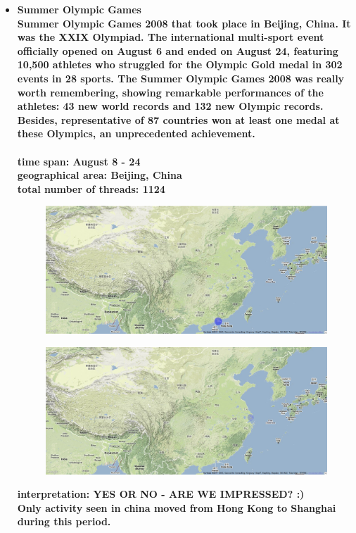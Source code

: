 \documentclass[11pt,a4paper,english]{article}
\begin{document}
\begin{itemize}
						

					\item \bf Summer Olympic Games \rm
						\\ Summer Olympic Games 2008 that took place in Beijing, China. It was the XXIX Olympiad. The international multi-sport event officially opened on August 6 and ended on August 24, featuring 10,500 athletes who struggled for the Olympic Gold medal in 302 events in 28 sports. The Summer Olympic Games 2008 was really worth remembering, showing remarkable performances of the athletes: 43 new world records and 132 new Olympic records. Besides, representative of 87 countries won at least one medal at these Olympics, an unprecedented achievement.
						\\\\ \bf time span: \rm August 8 - 24
						\\ \bf geographical area: \rm Beijing, China
						\\ \bf total number of threads: \rm 1124
						\begin{figure}[H]
							\vspace{-13pt}
  							\begin{center}
								\includegraphics[width=130mm]{img/pre-olympic}
							\end{center}
							\vspace{-13pt}
						\end{figure}
						\begin{figure}[H]
							\vspace{-13pt}
	  						\begin{center}
								\includegraphics[width=130mm]{img/post-olympic}
							\end{center}
							\vspace{-13pt}
						\end{figure}	
						\bf interpretation: \rm YES OR NO - ARE WE IMPRESSED? :)
						\\ Only activity seen in china moved from Hong Kong to Shanghai during this period.
						

\end{itemize}
\end{document}
